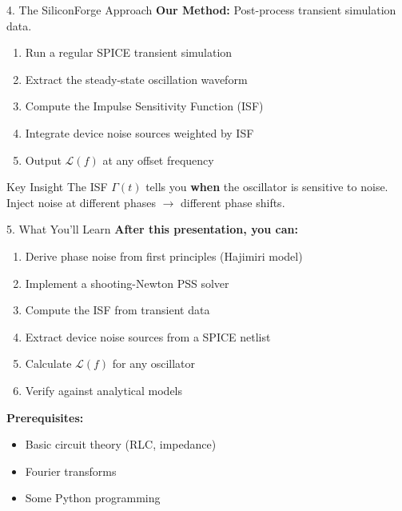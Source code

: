 \documentclass[aspectratio=169, 11pt]{beamer}
\begin{document}
\begin{frame}{4. The SiliconForge Approach}
    \textbf{Our Method:} Post-process transient simulation data.

    \vspace{0.5em}
    \begin{enumerate}
        \item Run a regular SPICE transient simulation
        \item Extract the steady-state oscillation waveform
        \item Compute the Impulse Sensitivity Function (ISF)
        \item Integrate device noise sources weighted by ISF
        \item Output $\mathcal{L}(f)$ at any offset frequency
    \end{enumerate}

    \vspace{0.5em}
    \begin{block}{Key Insight}
        The ISF $\Gamma(t)$ tells you \textbf{when} the oscillator is sensitive to noise. Inject noise at different phases $\rightarrow$ different phase shifts.
    \end{block}
\end{frame}

\begin{frame}{5. What You'll Learn}
    \textbf{After this presentation, you can:}
    \begin{enumerate}
        \item Derive phase noise from first principles (Hajimiri model)
        \item Implement a shooting-Newton PSS solver
        \item Compute the ISF from transient data
        \item Extract device noise sources from a SPICE netlist
        \item Calculate $\mathcal{L}(f)$ for any oscillator
        \item Verify against analytical models
    \end{enumerate}

    \vspace{0.5em}
    \textbf{Prerequisites:}
    \begin{itemize}
        \item Basic circuit theory (RLC, impedance)
        \item Fourier transforms
        \item Some Python programming
    \end{itemize}
\end{frame}
\end{document}
